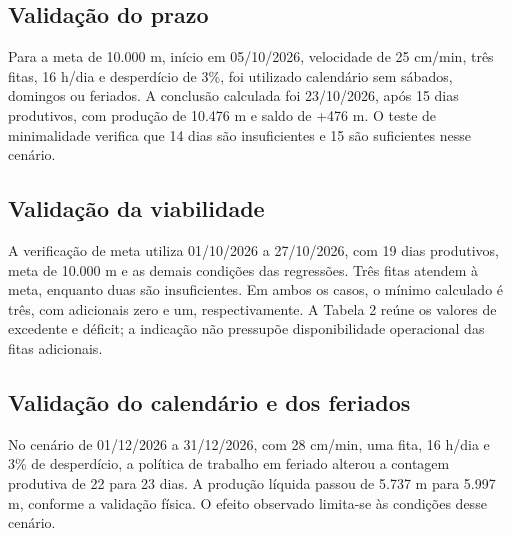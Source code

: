 \documentclass[12pt]{article}
\begin{document}
\subsection{Validação do prazo}\label{validauxe7uxe3o-do-prazo}

Para a meta de 10.000 m, início em 05/10/2026, velocidade de 25 cm/min, três fitas, 16 h/dia e desperdício de 3\%, foi utilizado calendário sem sábados, domingos ou feriados. A conclusão calculada foi 23/10/2026, após 15 dias produtivos, com produção de 10.476 m e saldo de +476 m. O teste de minimalidade verifica que 14 dias são insuficientes e 15 são suficientes nesse cenário.

\subsection{Validação da viabilidade}\label{validauxe7uxe3o-da-viabilidade}

A verificação de meta utiliza 01/10/2026 a 27/10/2026, com 19 dias produtivos, meta de 10.000 m e as demais condições das regressões. Três fitas atendem à meta, enquanto duas são insuficientes. Em ambos os casos, o mínimo calculado é três, com adicionais zero e um, respectivamente. A Tabela 2 reúne os valores de excedente e déficit; a indicação não pressupõe disponibilidade operacional das fitas adicionais.

\subsection{Validação do calendário e dos feriados}\label{validauxe7uxe3o-do-calenduxe1rio-e-dos-feriados}

No cenário de 01/12/2026 a 31/12/2026, com 28 cm/min, uma fita, 16 h/dia e 3\% de desperdício, a política de trabalho em feriado alterou a contagem produtiva de 22 para 23 dias. A produção líquida passou de 5.737 m para 5.997 m, conforme a validação física. O efeito observado limita-se às condições desse cenário.
\end{document}
